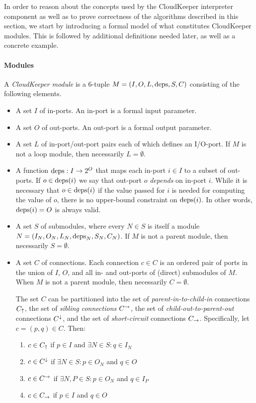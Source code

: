 \documentclass[paper=letter,fontsize=11pt,captions=tableheading]{scrartcl}
\numberwithin{equation}{section}
\newcommand{\pow}[1]{2^{#1}}
\theoremstyle{algorithm}
\theoremstyle{plain}
\theoremstyle{nonumberplain}
\begin{document}
In order to reason about the concepts used by the CloudKeeper interpreter component as well as to prove correctness of the algorithms described in this section, we start by introducing a formal model of what constitutes CloudKeeper modules. This is followed by additional definitions needed later, as well as a concrete example.

\paragraph{Modules}

A \emph{CloudKeeper module} is a 6-tuple $M = (I, O, L, \operatorname{deps}, S, C)$ consisting of the following elements.
%
\begin{itemize}
	\item A set $I$ of in-ports. An in-port is a formal input parameter.
	\item A set $O$ of out-ports. An out-port is a formal output parameter.
	\item A set $L$ of in-port/out-port pairs each of which defines an I/O-port. If $M$ is not a loop module, then necessarily $L = \emptyset$.
	\item A function $\deps: I \to \pow O$ that maps each in-port $i \in I$ to a subset of out-ports. If $o \in \operatorname{deps}(i)$ we say that out-port $o$ \emph{depends} on in-port $i$. While it is necessary that $o \in \operatorname{deps}(i)$ if the value passed for $i$ is needed for computing the value of $o$, there is no upper-bound constraint on $\operatorname{deps}(i)$. In other words, $\operatorname{deps}(i) = O$ is always valid.
	\item A set $S$ of submodules, where every $N \in S$ is itself a module $N = (I_N, O_N, L_N, \operatorname{deps}_N, S_N, C_N)$. If $M$ is not a parent module, then necessarily $S = \emptyset$.
	\item A set $C$ of connections. Each connection $c \in C$ is an ordered pair of ports in the union of $I$, $O$, and all in\nobreakdash- and out-ports of (direct) submodules of $M$. When $M$ is not a parent module, then necessarily $C = \emptyset$.

	The set $C$ can be partitioned into the set of \emph{parent-in-to-child-in} connections $C_{\uparrow}$, the set of \emph{sibling connections} $C^{\to}$, the set of \emph{child-out-to-parent-out} connections $C^{\downarrow}$, and the set of \emph{short-circuit} connections $C_{\to}$. Specifically, let $c = (p,q) \in C$. Then:
		\begin{enumerate}
			\item $c \in C_{\uparrow}$ if $p \in I$ and $\exists N \in S: q \in I_N$
			\item $c \in C^{\downarrow}$ if $\exists N \in S: p \in O_N$ and $q \in O$
			\item $c \in C^{\to}$ if $\exists N, P \in S: p \in O_N$ and $q \in I_P$
			\item $c \in C_{\to}$ if $p \in I$ and $q \in O$
		\end{enumerate}
\end{itemize}
\end{document}
